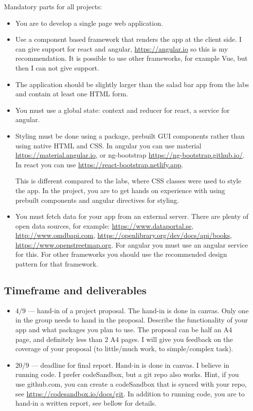 \documentclass[fleqn, article, a4paper]{memoir}
\begin{document}
\noindent Mandatory parts for all projects:
\begin{itemize}\firmlist
\item You are to develop a single page web application.
\item Use a component based framework that renders the app at the client side. I can give support for react and angular, \url{https://angular.io} so this is my recommendation. It is possible to use other frameworks, for example Vue, but then I can not give support.
\item The application should be slightly larger than the salad bar app from the labs and contain at least one HTML form.
\item You must use a global state: context and reducer for react, a service for angular.
\item Styling must be done using a package, prebuilt GUI components rather than using native HTML and CSS. In angular you can use material \url{https://material.angular.io}, or ng-bootstrap \url{https://ng-bootstrap.github.io/}. In react you can use \url{https://react-bootstrap.netlify.app}. 

This is different compared to the labs, where CSS classes were used to style the app. In the project, you are to get hands on experience with using prebuilt components and angular directives for styling.
\item You must fetch data for your app from an external server. There are plenty of open data sources, for example: \url{https://www.dataportal.se}, \url{http://www.omdbapi.com}, \url{https://openlibrary.org/dev/docs/api/books}, \url{https://www.openstreetmap.org}. For angular you must use an angular service for this. For other frameworks you should use the recommended design pattern for that framework.
\end{itemize}

\subsection*{Timeframe and deliverables}

\begin{itemize}
\item 4/9 --- hand-in of a project proposal. The hand-in is done in canvas. Only one in the group needs to hand in the proposal. Describe the functionality of your app and what packages you plan to use. The proposal can be half an A4 page, and definitely less than 2 A4 pages. I will give you feedback on the coverage of your proposal (to little/much work, to simple/complex task).
\item 20/9 --- deadline for final report. Hand-in is done in canvas. I believe in running code. I prefer codeSandbox, but a git repo also works. Hint, if you use github.com, you can create a codeSandbox that is synced with your repo, see \url{https://codesandbox.io/docs/git}. In addition to running code, you are to hand-in a written report, see bellow for details.
\end{itemize}
\end{document}
